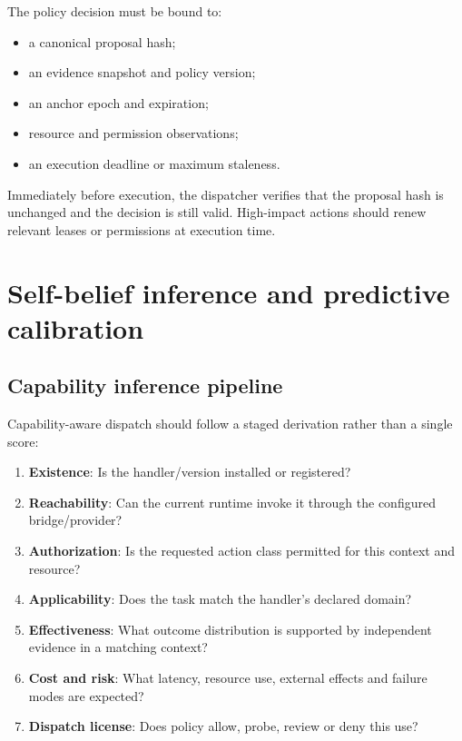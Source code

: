 \documentclass[11pt,oneside]{report}
\begin{document}
The policy decision must be bound to:

\begin{itemize}
  \item a canonical proposal hash;
  \item an evidence snapshot and policy version;
  \item an anchor epoch and expiration;
  \item resource and permission observations;
  \item an execution deadline or maximum staleness.
\end{itemize}

Immediately before execution, the dispatcher verifies that the proposal hash is unchanged and the decision is still valid. High-impact actions should renew relevant leases or permissions at execution time.

\chapter{Self-belief inference and predictive calibration}

\section{Capability inference pipeline}

Capability-aware dispatch should follow a staged derivation rather than a single score:

\begin{enumerate}
  \item \textbf{Existence}: Is the handler/version installed or registered?
  \item \textbf{Reachability}: Can the current runtime invoke it through the configured bridge/provider?
  \item \textbf{Authorization}: Is the requested action class permitted for this context and resource?
  \item \textbf{Applicability}: Does the task match the handler's declared domain?
  \item \textbf{Effectiveness}: What outcome distribution is supported by independent evidence in a matching context?
  \item \textbf{Cost and risk}: What latency, resource use, external effects and failure modes are expected?
  \item \textbf{Dispatch license}: Does policy allow, probe, review or deny this use?
\end{enumerate}
\end{document}

